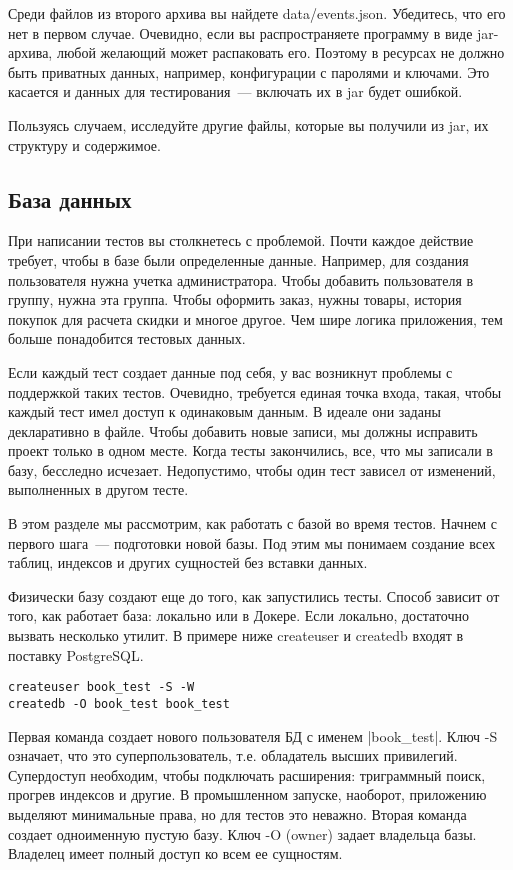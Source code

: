 Среди файлов из второго архива вы найдете data/events.json. Убедитесь, что его
нет в первом случае. Очевидно, если вы распространяете программу в виде
jar-архива, любой желающий может распаковать его. Поэтому в ресурсах не должно
быть приватных данных, например, конфигурации с паролями и ключами. Это касается
и данных для тестирования~--- включать их в jar будет ошибкой.

Пользуясь случаем, исследуйте другие файлы, которые вы получили из jar, их
структуру и содержимое.

\subsection{База данных}

При написании тестов вы столкнетесь с проблемой. Почти каждое действие требует,
чтобы в базе были определенные данные. Например, для создания пользователя нужна
учетка администратора. Чтобы добавить пользователя в группу, нужна эта
группа. Чтобы оформить заказ, нужны товары, история покупок для расчета скидки и
многое другое. Чем шире логика приложения, тем больше понадобится тестовых
данных.

Если каждый тест создает данные под себя, у вас возникнут проблемы с поддержкой
таких тестов. Очевидно, требуется единая точка входа, такая, чтобы каждый тест
имел доступ к одинаковым данным. В идеале они заданы декларативно в файле. Чтобы
добавить новые записи, мы должны исправить проект только в одном месте. Когда
тесты закончились, все, что мы записали в базу, бесследно исчезает. Недопустимо,
чтобы один тест зависел от изменений, выполненных в другом тесте.

В этом разделе мы рассмотрим, как работать с базой во время тестов. Начнем с
первого шага~--- подготовки новой базы. Под этим мы понимаем создание всех таблиц,
индексов и других сущностей без вставки данных.

Физически базу создают еще до того, как запустились тесты. Способ зависит от
того, как работает база: локально или в Докере. Если локально, достаточно
вызвать несколько утилит. В примере ниже createuser и createdb входят в поставку
PostgreSQL.

\begin{verbatim}
createuser book_test -S -W
createdb -O book_test book_test
\end{verbatim}

Первая команда создает нового пользователя БД с именем \spverb|book_test|. Ключ -S
означает, что это суперпользователь, т.е. обладатель высших
привилегий. Супердоступ необходим, чтобы подключать расширения: триграммный
поиск, прогрев индексов и другие. В промышленном запуске, наоборот, приложению
выделяют минимальные права, но для тестов это неважно. Вторая команда создает
одноименную пустую базу. Ключ -O (owner) задает владельца базы. Владелец имеет
полный доступ ко всем ее сущностям.

